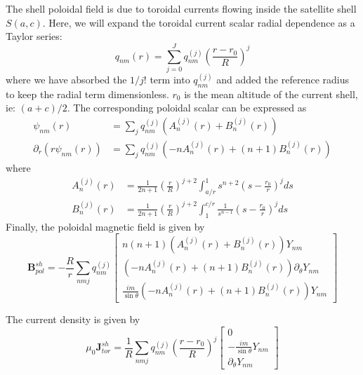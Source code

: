 \documentclass{article}
\newcommand{\B}{\mathbf{B}}
\newcommand{\J}{\mathbf{J}}
\begin{document}
The shell poloidal field is due to toroidal currents flowing inside the satellite shell $S(a,c)$. Here,
we will expand the toroidal current scalar radial dependence as a Taylor series:
\begin{equation}
q_{nm}(r) = \sum_{j=0}^J q_{nm}^{(j)} \left( \frac{r - r_0}{R} \right)^j
\end{equation}
where we have absorbed the $1/j!$ term into $q_{nm}^{(j)}$ and added the reference radius
to keep the radial term dimensionless. $r_0$ is the mean altitude of the current shell,
ie: $(a+c)/2$. The corresponding poloidal scalar can be expressed
as
\begin{align}
\psi_{nm}(r) &= \sum_j q_{nm}^{(j)} \left( A_n^{(j)}(r) + B_n^{(j)}(r) \right) \\
\partial_r \left( r \psi_{nm}(r) \right) &= \sum_j q_{nm}^{(j)} \left( -n A_n^{(j)}(r) + (n+1) B_n^{(j)}(r) \right)
\end{align}
where
\begin{align}
A_n^{(j)}(r) &= \frac{1}{2n + 1} \left( \frac{r}{R} \right)^{j+2} \int_{a/r}^1 s^{n+2} \left( s - \frac{r_0}{r} \right)^j ds \\
B_n^{(j)}(r) &= \frac{1}{2n + 1} \left( \frac{r}{R} \right)^{j+2} \int_{1}^{c/r} \frac{1}{s^{n-1}} \left( s - \frac{r_0}{r} \right)^j ds
\end{align}
Finally, the poloidal magnetic field is given by
\begin{equation}
\B_{pol}^{sh} = -\frac{R}{r} \sum_{nmj} q_{nm}^{(j)}
\left[
\begin{array}{c}
n(n+1) \left( A_n^{(j)}(r) + B_n^{(j)}(r) \right) Y_{nm} \\
\left( -n A_n^{(j)}(r) + (n+1) B_n^{(j)}(r) \right) \partial_{\theta} Y_{nm} \\
\frac{im}{\sin{\theta}} \left( -n A_n^{(j)}(r) + (n+1) B_n^{(j)}(r) \right) Y_{nm}
\end{array}
\right]
\end{equation}

The current density is given by
\begin{equation}
\mu_0 \J_{tor}^{sh} = \frac{1}{R} \sum_{nmj} q_{nm}^{(j)}
\left( \frac{r - r_0}{R} \right)^j
\left[
\begin{array}{c}
0 \\
-\frac{im}{\sin{\theta}} Y_{nm} \\
\partial_{\theta} Y_{nm}
\end{array}
\right]
\end{equation}
\end{document}
